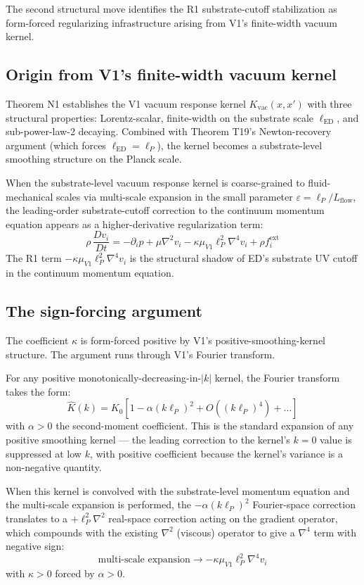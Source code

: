 \documentclass[11pt,a4paper]{article}
\begin{document}
The second structural move identifies the R1 substrate-cutoff stabilization as form-forced regularizing infrastructure arising from V1's finite-width vacuum kernel.

\subsection{Origin from V1's finite-width vacuum kernel}

Theorem N1 establishes the V1 vacuum response kernel $K_{\mathrm{vac}}(x, x')$ with three structural properties: Lorentz-scalar, finite-width on the substrate scale $\ell_{\mathrm{ED}}$, and sub-power-law-2 decaying. Combined with Theorem T19's Newton-recovery argument (which forces $\ell_{\mathrm{ED}} = \ell_P$), the kernel becomes a substrate-level smoothing structure on the Planck scale.

When the substrate-level vacuum response kernel is coarse-grained to fluid-mechanical scales via multi-scale expansion in the small parameter $\varepsilon = \ell_P / L_{\mathrm{flow}}$, the leading-order substrate-cutoff correction to the continuum momentum equation appears as a higher-derivative regularization term:
\[
\rho\, \frac{Dv_i}{Dt} = -\partial_i p + \mu\nabla^2 v_i - \kappa\mu_{V1}\ell_P^2\nabla^4 v_i + \rho f^{\mathrm{ext}}_i
\]
The R1 term $-\kappa\mu_{V1}\ell_P^2\nabla^4 v_i$ is the structural shadow of ED's substrate UV cutoff in the continuum momentum equation.

\subsection{The sign-forcing argument}

The coefficient $\kappa$ is form-forced positive by V1's positive-smoothing-kernel structure. The argument runs through V1's Fourier transform.

For any positive monotonically-decreasing-in-$|k|$ kernel, the Fourier transform takes the form:
\[
\hat K(k) = K_0\left[1 - \alpha(k\ell_P)^2 + O((k\ell_P)^4) + \ldots\right]
\]
with $\alpha > 0$ the second-moment coefficient. This is the standard expansion of any positive smoothing kernel --- the leading correction to the kernel's $k = 0$ value is suppressed at low $k$, with positive coefficient because the kernel's variance is a non-negative quantity.

When this kernel is convolved with the substrate-level momentum equation and the multi-scale expansion is performed, the $-\alpha(k\ell_P)^2$ Fourier-space correction translates to a $+\ell_P^2\nabla^2$ real-space correction acting on the gradient operator, which compounds with the existing $\nabla^2$ (viscous) operator to give a $\nabla^4$ term with negative sign:
\[
\text{multi-scale expansion} \to -\kappa\mu_{V1}\ell_P^2\nabla^4 v_i
\]
with $\kappa > 0$ forced by $\alpha > 0$.
\end{document}

